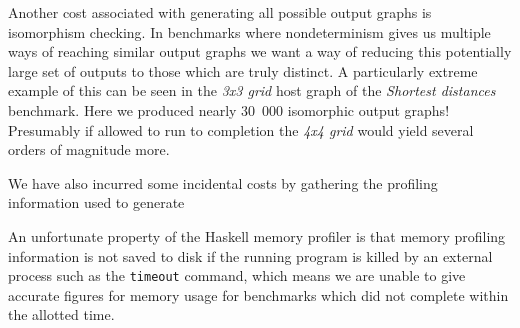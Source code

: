 
Another cost associated with generating all possible output graphs is isomorphism checking. In benchmarks where nondeterminism gives us multiple ways of reaching similar output graphs we want a way of reducing this potentially large set of outputs to those which are truly distinct. A particularly extreme example of this can be seen in the \textit{3x3 grid} host graph of the \textit{Shortest distances} benchmark. Here we produced nearly 30~000 isomorphic output graphs! Presumably if allowed to run to completion the \textit{4x4 grid} would yield several orders of magnitude more.



We have also incurred some incidental costs by gathering the profiling information used to generate 








An unfortunate property of the Haskell memory profiler is that memory profiling information is not saved to disk if the running program is killed by an external process such as the \texttt{timeout} command, which means we are unable to give accurate figures for memory usage for benchmarks which did not complete within the allotted time.


